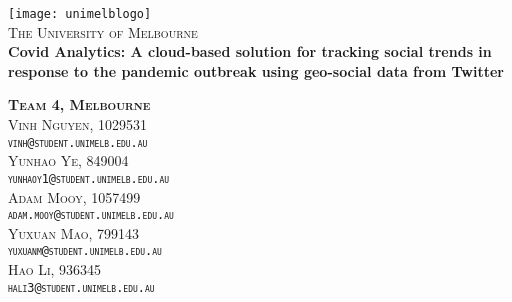 \begin{titlepage}


	\centering
 
    \vspace*{0.5 cm}
    \texttt{[image: unimelblogo]}\\[1.0 cm]	%
    \textsc{\LARGE The University of Melbourne}\\[2.0 cm]	%

\vfill
    { \huge \bfseries Covid Analytics: A cloud-based solution for tracking social trends in response to the pandemic outbreak using geo-social data from Twitter}\\
\vfill



\textsc{\bfseries Team 4, Melbourne}
\vspace{5mm}\\
\textsc{ Vinh Nguyen, 1029531\\
    \texttt{vinh@student.unimelb.edu.au} }\\
    \vspace{5mm}
\textsc{ Yunhao Ye, 849004\\
    \texttt{yunhaoy1@student.unimelb.edu.au}}\\
        \vspace{5mm}
\textsc{ Adam Mooy, 1057499\\
    \texttt{adam.mooy@student.unimelb.edu.au}}\\
    \vspace{5mm}
\textsc{ Yuxuan Mao, 799143\\
    \texttt{yuxuanm@student.unimelb.edu.au}}\\
    \vspace{5mm}
\textsc{ Hao Li, 936345\\
    \texttt{hali3@student.unimelb.edu.au}}
\end{titlepage}
